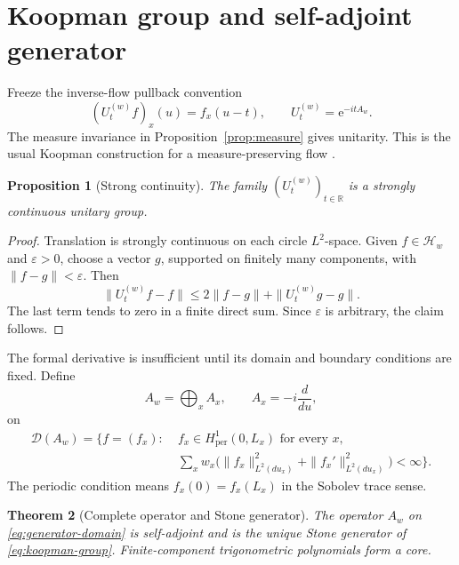 \documentclass[11pt]{article}
\newtheorem{theorem}{Theorem}
\newtheorem{proposition}[theorem]{Proposition}
\theoremstyle{definition}
\theoremstyle{remark}
\newcommand{\R}{\mathbb{R}}
\newcommand{\Hh}{\mathcal{H}}
\newcommand{\D}{\mathcal{D}}
\newcommand{\e}{\mathrm{e}}
\begin{document}
\section{Koopman group and self-adjoint generator}
\label{sec:generator}

Freeze the inverse-flow pullback convention
\begin{equation}
 (U_t^{(w)}f)_x(u)=f_x(u-t),
 \qquad U_t^{(w)}=\e^{-itA_w}.
 \label{eq:koopman-group}
\end{equation}
The measure invariance in Proposition~\ref{prop:measure} gives unitarity.
This is the usual Koopman construction for a measure-preserving flow
\citep{TerElstLemanczyk2017}.

\begin{proposition}[Strong continuity]
\label{prop:strong-continuity}
The family \((U_t^{(w)})_{t\in\R}\) is a strongly continuous unitary group.
\end{proposition}

\begin{proof}
Translation is strongly continuous on each circle \(L^2\)-space.  Given
\(f\in\Hh_w\) and \(\varepsilon>0\), choose a vector \(g\), supported on
finitely many components, with \(\|f-g\|<\varepsilon\).  Then
\[
 \|U_t^{(w)}f-f\|
 \leq2\|f-g\|+\|U_t^{(w)}g-g\|.
\]
The last term tends to zero in a finite direct sum.  Since \(\varepsilon\)
is arbitrary, the claim follows.
\end{proof}

The formal derivative is insufficient until its domain and boundary
conditions are fixed.  Define
\begin{equation}
 A_w=\bigoplus_xA_x,
 \qquad A_x=-i\frac d{du},
 \label{eq:global-generator}
\end{equation}
on
\begin{equation}
\begin{split}
 \D(A_w)=\bigg\{f=(f_x):\;&
 f_x\in H^1_{\mathrm{per}}(0,L_x)\text{ for every }x,\\
 &\sum_xw_x\bigl(\|f_x\|_{L^2(du_x)}^2
                  +\|f_x'\|_{L^2(du_x)}^2\bigr)<\infty\bigg\}.
\end{split}
\label{eq:generator-domain}
\end{equation}
The periodic condition means \(f_x(0)=f_x(L_x)\) in the Sobolev trace
sense.

\begin{theorem}[Complete operator and Stone generator]
\label{thm:self-adjoint}
The operator \(A_w\) on \eqref{eq:generator-domain} is self-adjoint and is
the unique Stone generator of \eqref{eq:koopman-group}.  Finite-component
trigonometric polynomials form a core.
\end{theorem}
\end{document}
